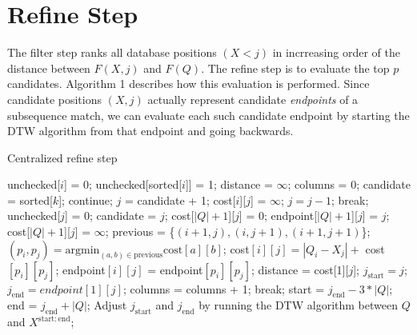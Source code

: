 \documentclass{article}
\begin{document}
\section{Refine Step}
The filter step ranks all database positions $(X<j)$ in incrreasing order of the distance between $F(X,j)$ and $F(Q)$. The refine step is to evaluate the top $p$ candidates. Algorithm 1 describes how this evaluation is performed. Since candidate positions $(X, j)$ actually represent candidate \emph{endpoints} of a subsequence match, we can evaluate each such candidate endpoint by starting the DTW algorithm from that endpoint and going backwards. \par

\begin{algorithm}
	\caption{Centralized refine step}
	\begin{algorithmic}[1]
			\State unchecked[$i$] = 0;
		\EndFor
			\State unchecked[sorted[$i$]] = 1;
		\EndFor
			\State distance = $\infty$;
			\State	columns = 0;
			\State candidate = sorted[$k$];
				\State continue;
			\EndIf
			\State $j$ = candidate + 1;
				\State cost[$i$][$j$] = $\infty$;
			\EndFor
				\State $j = j - 1$;
					\State break;
				\EndIf
					\State unchecked[$j$] = 0;
					\State candidate = $j$;
					\State cost[$|Q|+1$][$j$] = 0;
					\State endpoint[$|Q|+1$][$j$] = $j$;
				\Else
					\State cost[$|Q|+1$][$j$] = $\infty$;
				\EndIf
					\State previous = \{$(i+1, j), (i, j+1), (i+1, j+1)$\};
					\State $(p_i, p_j) = \mathrm{argmin}_{(a,b)\in\mathrm{previous}}\mathrm{cost}[a][b]$;
					\State cost$[i][j] = |Q_i - X_j| +$ cost$[p_i][p_j]$;
					\State endpoint$[i][j]$ = endpoint$[p_i][p_j]$;
				\EndFor
					\State distance = cost[1][$j$];
					\State $j_{\mathrm{start}} = j$;
					\State $j_{\mathrm{end}} = endpoint[1][j]$;
				\EndIf
				\State columns = columns + 1;
					\State break;
				\EndIf
			\EndWhile
		\EndFor
		\State start = $j_{\mathrm{end}} - 3*|Q|$;
		\State end = $j_{\mathrm{end}} + |Q|$;
		\State Adjust $j_{\mathrm{start}}$ and $j_{\mathrm{end}}$ by running the DTW algorithm between $Q$ and $X^{\mathrm{start:end}}$;
	\end{algorithmic}
\end{algorithm}
\end{document}
